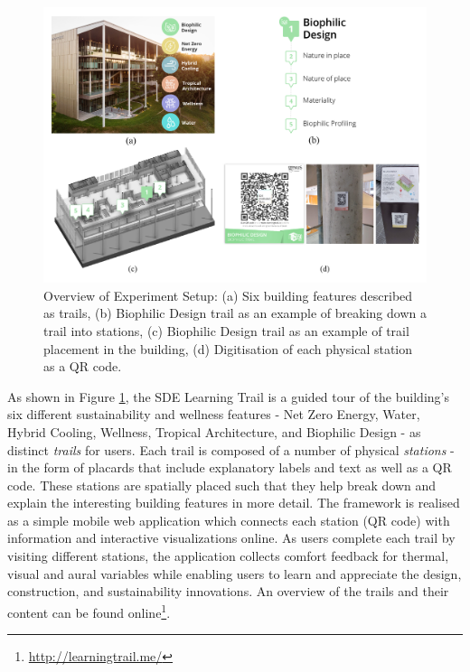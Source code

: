 
\begin{figure}
\begin{center}
\includegraphics[width=\textwidth, trim= 0cm 0cm 0cm 0cm,clip]{Images/Fig1.jpg}
\caption{Overview of Experiment Setup: (a) Six building features described as trails, (b) Biophilic Design trail as an example of breaking down a trail into stations, (c) Biophilic Design trail as an example of trail placement in the building, (d) Digitisation of each physical station as a QR code.}
\label{fig:framework}
\end{center}
\end{figure}  

As shown in Figure \ref{fig:framework}, the SDE Learning Trail is a guided tour of the building's six different sustainability and wellness features - Net Zero Energy, Water, Hybrid Cooling, Wellness, Tropical Architecture, and Biophilic Design - as distinct \emph{trails} for users. Each trail is composed of a number of physical \emph{stations} - in the form of placards that include explanatory labels and text as well as a QR code. These stations are spatially placed such that they help break down and explain the interesting building features in more detail. The framework is realised as a simple mobile web application which connects each station (QR code) with information and interactive visualizations online. As users complete each trail by visiting different stations, the application collects comfort feedback for thermal, visual and aural variables while enabling users to learn and appreciate the design, construction, and sustainability innovations. An overview of the trails and their content can be found online\footnote{\url{http://learningtrail.me/}}.

